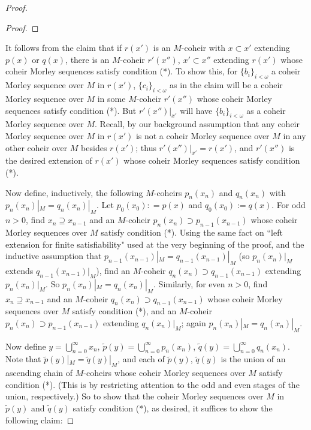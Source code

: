 \documentclass{amsart}
\theoremstyle{definition}
\theoremstyle{remark}
\numberwithin{equation}{section}
\begin{document}
\begin{proof}
\begin{proof}
\end{proof}

It follows from the claim that if $r(x')$ is an $M$-coheir with $x \subset x'$ extending $p(x)$ or $q(x)$, there is an $M$-coheir $r'(x'')$, $x' \subset x''$ extending $r(x')$ whose coheir Morley sequences satisfy condition (*). To show this, for $\{b_{i}\}_{i< \omega}$ a coheir Morley sequence over $M$ in $r(x')$, $\{c_{i}\}_{i < \omega}$ as in the claim will be a coheir Morley sequence over $M$ in some $M$-coheir $r'(x'')$ whose coheir Morley sequences satisfy condition (*). But  $r'(x'')|_{x'}$ will have $\{b_{i}\}_{i< \omega}$ as a coheir Morley sequence over $M$. Recall, by our background assumption that any coheir Morley sequence over $M$ in $r(x')$ is not a coheir Morley sequence over $M$ in any other coheir over $M$ besides $r(x')$; thus $r'(x'')|_{x'} = r(x')$, and $r'(x'')$ is the desired extension of $r(x')$ whose  coheir Morley sequences satisfy condition (*).

Now define, inductively, the following $M$-coheirs $p_{n}(x_{n})$ and $q_{n}(x_{n})$ with $p_{n}(x_{n})|_{M} = q_{n}(x_{n})|_{M}$. Let $p_{0}(x_{0}) : = p(x) $ and $q_{0}(x_{0}) := q(x)$. For odd $n> 0$, find $x_{n} \supseteq x_{n-1}$ and an $M$-coheir $p_{n}(x_{n}) \supset p_{n-1}(x_{n-1})$ whose coheir Morley sequences over $M$ satisfy condition (*). Using the same fact on  ``left extension for finite satisfiability" used at the very beginning of the proof, and the inductive assumption that $p_{n-1}(x_{n-1})|_{M} = q_{n-1}(x_{n-1})|_{M}$ (so $p_{n}(x_{n})|_{M}$ extends $q_{n-1}(x_{n-1})|_{M}$), find an $M$-coheir $q_{n}(x_{n}) \supset q_{n-1}(x_{n-1})$ extending $p_{n}(x_{n})|_{M}$. So $p_{n}(x_{n})|_{M} = q_{n}(x_{n})|_{M}$. Similarly, for even $n > 0$,  find $x_{n} \supseteq x_{n-1}$ and an $M$-coheir $q_{n}(x_{n}) \supset q_{n-1}(x_{n-1})$ whose coheir Morley sequences over $M$ satisfy condition (*), and an $M$-coheir $p_{n}(x_{n}) \supset p_{n-1}(x_{n-1})$ extending $q_{n}(x_{n})|_{M}$; again $p_{n}(x_{n})|_{M} = q_{n}(x_{n})|_{M}$.

Now define $y = \bigcup^{\infty}_{n=0} x_{n}$,  $\tilde{p}(y) = \bigcup^{\infty}_{n=0} p_{n}(x_{n})$, $\tilde{q}(y) = \bigcup^{\infty}_{n=0} q_{n}(x_{n})$. Note that $\tilde{p}(y)|_{M} = \tilde{q}(y)|_{M}$, and each of $\tilde{p}(y)$, $\tilde{q}(y)$ is the union of an ascending chain of  $M$-coheirs whose coheir Morley sequences over $M$ satisfy condition (*). (This is by restricting attention to the odd and even stages of the union, respectively.) So to show that the coheir Morley sequences over $M$ in $\tilde{p}(y)$ and $\tilde{q}(y)$ satisfy condition (*), as desired, it suffices to show the following claim:



\end{proof}
\end{document}
